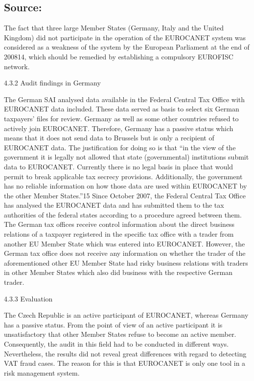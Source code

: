 \documentclass[10pt]{article}
\begin{document}
\subsection*{Source:}

The fact that three large Member States (Germany, Italy and the United Kingdom) did not participate in the operation of the EUROCANET system was considered as a weakness of the system by the European Parliament at the end of 200814, which should be remedied by establishing a compulsory EUROFISC network.


4.3.2 Audit findings in Germany

The German SAI analysed data available in the Federal Central Tax Office with EUROCANET data included.
These data served as basis to select six German taxpayers' files for review.
Germany as well as some other countries refused to actively join EUROCANET.
Therefore, Germany has a passive status which means that it does not send data to Brussels but is only a recipient of EUROCANET data.
The justification for doing so is that “in the view of the government it is legally not allowed that state (governmental) institutions submit data to EUROCANET.
Currently there is no legal basis in place that would permit to break applicable tax secrecy provisions.
Additionally, the government has no reliable information on how those data are used within EUROCANET by the other Member States.”15 Since October 2007, the Federal Central Tax Office has analysed the EUROCANET data and has submitted them to the tax authorities of the federal states according to a procedure agreed between them.
The German tax offices receive control information about the direct business relations of a taxpayer registered in the specific tax office with a trader from another EU Member State which was entered into EUROCANET.
However, the German tax office does not receive any information on whether the trader of the aforementioned other EU Member State had risky business relations with traders in other Member States which also did business with the respective German trader.


4.3.3 Evaluation

The Czech Republic is an active participant of EUROCANET, whereas Germany has a passive status.
From the point of view of an active participant it is unsatisfactory that other Member States refuse to become an active member.
Consequently, the audit in this field had to be conducted in different ways.
Nevertheless, the results did not reveal great differences with regard to detecting VAT fraud cases. The reason for this is that EUROCANET is only one tool in a risk management system.
\end{document}
